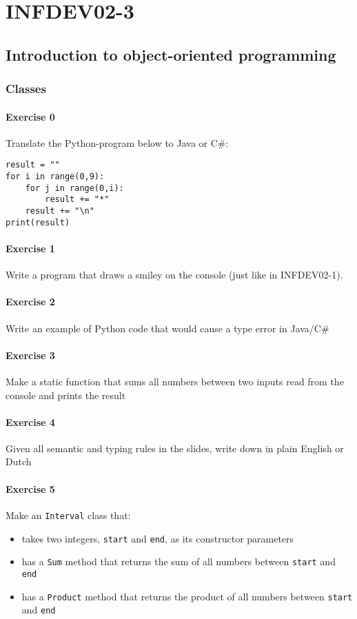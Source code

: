 \setcounter{part}{3}
\part{INFDEV02-3}
\setcounter{chapter}{0}
\chapter{Introduction to object-oriented programming}

    \section{Classes}
    
\subsection{Exercise 0}
            Translate the Python-program below to Java or C\#:
            \begin{lstlisting}
result = ""
for i in range(0,9):
    for j in range(0,i):
        result += "*"
    result += "\n"
print(result)
            \end{lstlisting}

\subsection{Exercise 1} Write a program that draws a smiley on the console (just like in INFDEV02-1).
\subsection{Exercise 2} Write an example of Python code that would cause a type error in Java/C\#
\subsection{Exercise 3} Make a static function that sums all numbers between two inputs read from the console and prints the result
\subsection{Exercise 4} Given all semantic and typing rules in the slides, write down in plain English or Dutch
\subsection{Exercise 5} 
Make an \texttt{Interval} class that:
            \begin{itemize}
                \item takes two integers, \texttt{start} and \texttt{end}, as its constructor parameters
                \item has a \texttt{Sum} method that returns the sum of all numbers between \texttt{start} and \texttt{end}
                \item has a \texttt{Product} method that returns the product of all numbers between \texttt{start} and \texttt{end}
            \end{itemize}
